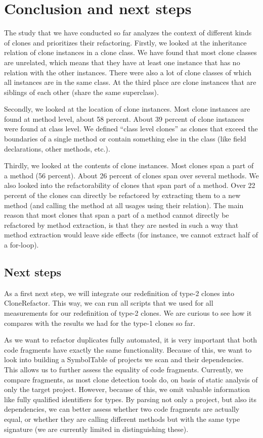 \documentclass[a4paper]{article}
\begin{document}
\section{Conclusion and next steps}
The study that we have conducted so far analyzes the context of different kinds of clones and prioritizes their refactoring. Firstly, we looked at the inheritance relation of clone instances in a clone class. We have found that most clone classes are unrelated, which means that they have at least one instance that has no relation with the other instances. There were also a lot of clone classes of which all instances are in the same class. At the third place are clone instances that are siblings of each other (share the same superclass).

Secondly, we looked at the location of clone instances. Most clone instances are found at method level, about 58 percent. About 39 percent of clone instances were found at class level. We defined ``class level clones'' as clones that exceed the boundaries of a single method or contain something else in the class (like field declarations, other methods, etc.).

Thirdly, we looked at the contents of clone instances. Most clones span a part of a method (56 percent). About 26 percent of clones span over several methods. We also looked into the refactorability of clones that span part of a method. Over 22 percent of the clones can directly be refactored by extracting them to a new method (and calling the method at all usages using their relation). The main reason that most clones that span a part of a method cannot directly be refactored by method extraction, is that they are nested in such a way that method extraction would leave side effects (for instance, we cannot extract half of a for-loop).

\subsection{Next steps}
As a first next step, we will integrate our redefinition of type-2 clones into CloneRefactor. This way, we can run all scripts that we used for all measurements for our redefinition of type-2 clones. We are curious to see how it compares with the results we had for the type-1 clones so far.

As we want to refactor duplicates fully automated, it is very important that both code fragments have exactly the same functionality. Because of this, we want to look into building a SymbolTable of projects we scan and their dependencies. This allows us to further assess the equality of code fragments. Currently, we compare fragments, as most clone detection tools do, on basis of static analysis of only the target project. However, because of this, we omit valuable information like fully qualified identifiers for types. By parsing not only a project, but also its dependencies, we can better assess whether two code fragments are actually equal, or whether they are calling different methods but with the same type signature (we are currently limited in distinguishing these).
\end{document}
